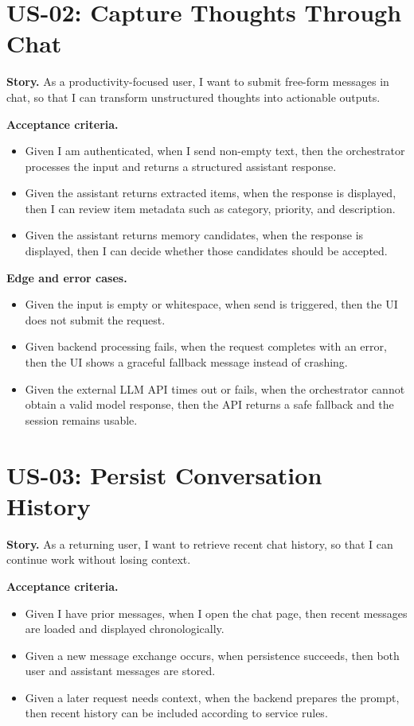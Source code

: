 \section{US-02: Capture Thoughts Through Chat}

\textbf{Story.} As a productivity-focused user, I want to submit free-form messages in chat, so that I can transform unstructured thoughts into actionable outputs.

\textbf{Acceptance criteria.}
\begin{itemize}
  \item Given I am authenticated, when I send non-empty text, then the orchestrator processes the input and returns a structured assistant response.
  \item Given the assistant returns extracted items, when the response is displayed, then I can review item metadata such as category, priority, and description.
  \item Given the assistant returns memory candidates, when the response is displayed, then I can decide whether those candidates should be accepted.
\end{itemize}

\textbf{Edge and error cases.}
\begin{itemize}
  \item Given the input is empty or whitespace, when send is triggered, then the UI does not submit the request.
  \item Given backend processing fails, when the request completes with an error, then the UI shows a graceful fallback message instead of crashing.
  \item Given the external LLM API times out or fails, when the orchestrator cannot obtain a valid model response, then the API returns a safe fallback and the session remains usable.
\end{itemize}

\section{US-03: Persist Conversation History}

\textbf{Story.} As a returning user, I want to retrieve recent chat history, so that I can continue work without losing context.

\textbf{Acceptance criteria.}
\begin{itemize}
  \item Given I have prior messages, when I open the chat page, then recent messages are loaded and displayed chronologically.
  \item Given a new message exchange occurs, when persistence succeeds, then both user and assistant messages are stored.
  \item Given a later request needs context, when the backend prepares the prompt, then recent history can be included according to service rules.
\end{itemize}

